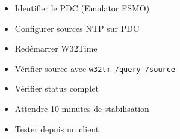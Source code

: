 \begin{itemize}
    \item[\checkmark] Identifier le PDC (Emulator FSMO)
    \item[\checkmark] Configurer sources NTP sur PDC
    \item[\checkmark] Redémarrer W32Time
    \item[\checkmark] Vérifier source avec \texttt{w32tm /query /source}
    \item[\checkmark] Vérifier status complet
    \item[\checkmark] Attendre 10 minutes de stabilisation
    \item[\checkmark] Tester depuis un client
\end{itemize}
